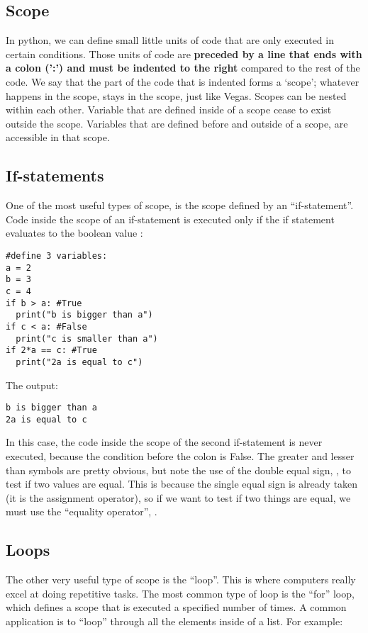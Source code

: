 \subsection{Scope}
In python, we can define small little units of code that are only executed in certain conditions. Those units of code are \textbf{preceded by a line that ends with a colon (':') and must be indented to the right} compared to the rest of the code. We say that the part of the code that is indented forms a `scope';  whatever happens in the scope, stays in the scope, just like Vegas. Scopes can be nested within each other. Variable that are defined inside of a scope cease to exist outside the scope. Variables that are defined before and outside of a scope, are accessible in that scope. 

\subsection{If-statements}
One of the most useful types of scope, is the scope defined by an ``if-statement''. Code inside the scope of an if-statement is executed only if the if statement evaluates to the boolean value :
\begin{lstlisting}[frame=single] 
#define 3 variables:
a = 2 
b = 3
c = 4
if b > a: #True
  print("b is bigger than a")
if c < a: #False
  print("c is smaller than a")
if 2*a == c: #True
  print("2a is equal to c")
\end{lstlisting}
The output:
\begin{verbatim}
b is bigger than a
2a is equal to c
\end{verbatim}
In this case, the code inside the scope of the second if-statement is never executed, because the condition before the colon is False. The greater and lesser than symbols are pretty obvious, but note the use of the double equal sign, \code{==}, to test if two values are equal. This is because the single equal sign is already taken (it is the assignment operator), so if we want to test if two things are equal, we must use the ``equality operator'', \code{==}.

\subsection{Loops}
The other very useful type of scope is the ``loop''. This is where computers really excel at doing repetitive tasks. The most common type of loop is the ``for'' loop, which defines a scope that is executed a specified number of times. A common application is to ``loop'' through all the elements inside of a list. For example:

